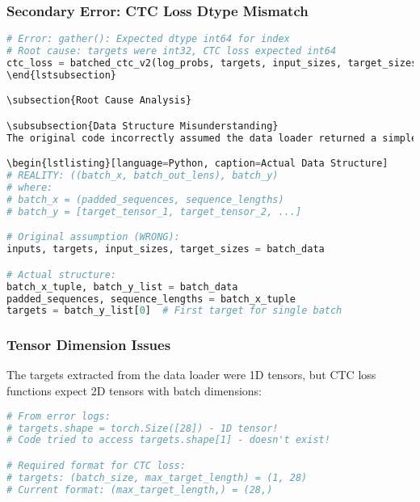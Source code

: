 \documentclass[11pt,a4paper]{article}
\begin{document}
\subsubsection{Secondary Error: CTC Loss Dtype Mismatch}
\begin{lstlisting}[language=Python, caption=CTC Loss Error]
# Error: gather(): Expected dtype int64 for index
# Root cause: targets were int32, CTC loss expected int64
ctc_loss = batched_ctc_v2(log_probs, targets, input_sizes, target_sizes)
\end{lstsubsection}

\subsection{Root Cause Analysis}

\subsubsection{Data Structure Misunderstanding}
The original code incorrectly assumed the data loader returned a simple tuple structure. In reality, the \texttt{collate\_input\_sequences} function returns a nested structure:

\begin{lstlisting}[language=Python, caption=Actual Data Structure]
# REALITY: ((batch_x, batch_out_lens), batch_y)
# where:
# batch_x = (padded_sequences, sequence_lengths)
# batch_y = [target_tensor_1, target_tensor_2, ...]

# Original assumption (WRONG):
inputs, targets, input_sizes, target_sizes = batch_data

# Actual structure:
batch_x_tuple, batch_y_list = batch_data
padded_sequences, sequence_lengths = batch_x_tuple
targets = batch_y_list[0]  # First target for single batch
\end{lstlisting}

\subsubsection{Tensor Dimension Issues}
The targets extracted from the data loader were 1D tensors, but CTC loss functions expect 2D tensors with batch dimensions:

\begin{lstlisting}[language=Python, caption=Tensor Dimension Analysis]
# From error logs:
# targets.shape = torch.Size([28]) - 1D tensor!
# Code tried to access targets.shape[1] - doesn't exist!

# Required format for CTC loss:
# targets: (batch_size, max_target_length) = (1, 28)
# Current format: (max_target_length,) = (28,)
\end{lstlisting}
\end{document}
